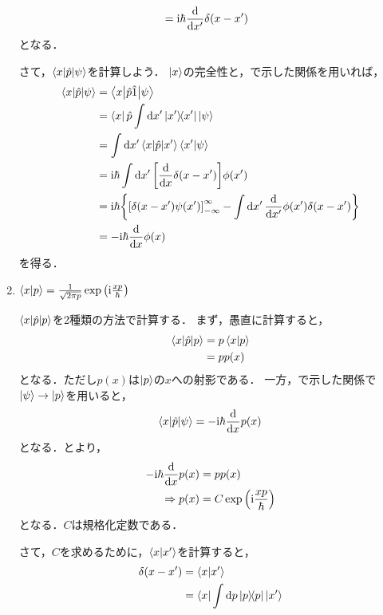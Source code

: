 \documentclass{report}
\begin{document}
\begin{enumerate}
\begin{align}
          &= \mathrm{i}\hbar\dv{x'}\delta(x - x')\label{xpxrime}
        \end{align}
        となる．
        \par
        さて，$\mel**{x}{\hat{p}}{\psi}$を計算しよう．
        $\ket{x}$の完全性と，で示した関係を用いれば，
        \begin{align}
          \mel**{x}{\hat{p}}{\psi} &= \mel**{x}{\hat{p}\hat{1}}{\psi} \\ 
          &= \bra{x}\hat{p}\int\dd{x'}\ketbra{x'}{x'}\ket{\psi} \\ 
          &= \int\dd{x'}\mel**{x}{\hat{p}}{x'}\braket{x'}{\psi} \\ 
          &= \mathrm{i}\hbar\int\dd{x'}\qty[\dv{x}\delta(x - x')]\phi(x') \\ 
          &= \mathrm{i}\hbar\qty{\qty[\delta\qty(x - x')\psi\qty(x')]_{-\infty}^{\infty} - \int\dd{x'}\dv{x'}\phi(x')\delta(x - x')} \\ 
          &= -\mathrm{i}\hbar\dv{x}\phi(x)\label{psix-diff}
        \end{align}
        を得る．
      \item $\braket{x}{p} = \frac{1}{\sqrt{2\pi p}}\exp\qty(\mathrm{i}\frac{xp}{\hbar})$ \par
        $\mel**{x}{\hat{p}}{p}$を2種類の方法で計算する．
        まず，愚直に計算すると，
        \begin{align}
          \mel**{x}{\hat{p}}{p} &= p\braket{x}{p} \\ 
          &= pp(x)\label{xpp-1}
        \end{align}
        となる．ただし$p(x)$は$\ket{p}$の$x$への射影である．
        一方，で示した関係で$\ket{\psi} \to \ket{p}$を用いると，
        \begin{align}
          \mel**{x}{\hat{p}}{\psi} = -\mathrm{i}\hbar\dv{x}p(x)\label{xpp-2}
        \end{align} 
        となる．とより，
        \begin{align}
          -\mathrm{i}\hbar\dv{x}p(x) &= pp(x) \\ 
          \Rightarrow p(x) &= C\exp\qty(\mathrm{i}\frac{xp}{\hbar})
        \end{align}
        となる．$C$は規格化定数である．
        \par
        さて，$C$を求めるために，$\braket{x}{x'}$を計算すると，
        \begin{align}
          \delta(x - x') &= \braket{x}{x'} \\ 
          &= \bra{x}\int\dd{p}\ketbra{p}{p}\ket{x'} \\ 

\end{align}
\end{enumerate}
\end{document}
